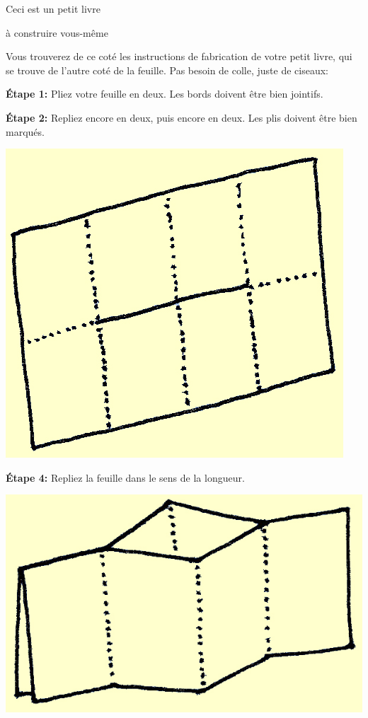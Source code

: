 \documentclass[a4paper,12pt]{article}
\begin{document}
\begin{center}
  {\Huge Ceci est un petit livre}

  {\Large à construire vous-même}
\end{center}

\large

Vous trouverez de ce coté les instructions de fabrication de votre
petit livre, qui se trouve de l'autre coté de la feuille.  Pas besoin
de colle, juste de ciseaux: 

\bigskip\bigskip


\noindent\textbf{Étape 1:} Pliez votre feuille en deux.
Les bords doivent être bien jointifs.

\noindent
\begin{minipage}[b]{.45\linewidth}
\medskip
\noindent\textbf{Étape 2:} Repliez encore en deux, puis encore en deux.  Les plis doivent être
bien marqués.

\medskip \centerline{\includegraphics{img/ptitlivre-etape2.jpg}}

\medskip
\noindent\textbf{Étape 4:} Repliez la feuille dans le sens de la longueur.\\

  \centerline{\includegraphics{img/ptitlivre-etape4.jpg}}


\end{minipage}
\end{document}
